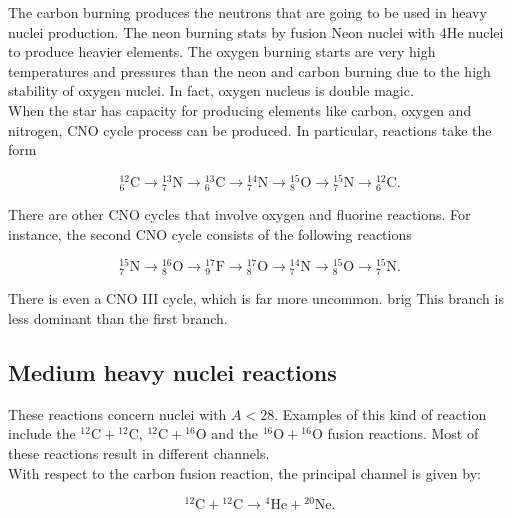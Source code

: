 \documentclass[openany]{book}
\begin{document}
The carbon burning produces the neutrons that are going to be used in heavy nuclei production. 
The neon burning stats by fusion Neon nuclei with 4He nuclei to produce heavier elements.
The oxygen burning starts are very high temperatures and pressures than the neon and carbon burning due to the high stability of oxygen nuclei. In fact, oxygen nucleus is double magic. \\

When the star has capacity for producing elements like carbon, oxygen and nitrogen,  CNO cycle process can be produced. In particular, reactions take the form 

\begin{equation} \label{eq:reaction_CNO_C}
	\mathrm{{}_{6}^{12}C  \rightarrow {}^{13}_{7}N  \rightarrow {}^{13}_{6}C  \rightarrow {}^{14}_{7}N  \rightarrow {}^{15}_{8}O  \rightarrow {}^{15}_{7}N \rightarrow {}^{12}_{6}C  }.
\end{equation}



There are other CNO cycles that involve oxygen and fluorine reactions. For instance, the second CNO cycle consists of the following reactions

\begin{equation} \label{eq:reaction_CNO_N}
	\mathrm{{}_{7}^{15}N  \rightarrow {}^{16}_{8}O  \rightarrow {}^{17}_{9}F  \rightarrow {}^{17}_{8}O  \rightarrow {}^{14}_{7}N  \rightarrow {}^{15}_{8}O \rightarrow {}^{15}_{7}N  }.
\end{equation}

There is even a CNO III cycle, which is far more uncommon. 
brig
This branch is less dominant than the first branch.

\subsection{Medium heavy nuclei reactions} \label{sub:mediumHeavyReactions}

These reactions concern nuclei with $A < 28$. Examples of this kind of reaction include the $\mathrm{{}^{12}C + {}^{12}C}$,  $\mathrm{{}^{12}C + {}^{16}O}$ and the  $\mathrm{{}^{16}O + {}^{16}O}$ fusion reactions. Most of these reactions result in different channels. \\ 

With respect to the carbon fusion reaction, the principal channel is given by: 

\begin{equation} \label{eq:reaction_C12fusion_alpha20Ne}
	\mathrm{{}^{12}C + {}^{12}C \rightarrow {}^{4}He + {}^{20}Ne}. 
\end{equation}
\end{document}
